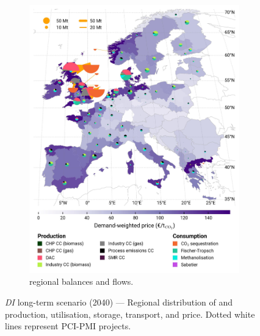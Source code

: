 \documentclass[final,5p,times,twocolumn,sort&compress]{elsarticle}
\begin{document}
\begin{figure}[htbp]
\begin{subfigure}[t]{0.49\textwidth}
      \includegraphics[width=1\textwidth]{maps/no-pipelines-no-pcipmi/base_s_adm___2040-balance_map_co2_stored} 
      \vspace{-0.7cm}
      \caption{ regional balances and flows.}
      \label{fig:DI_lt_2040_co2}
  \end{subfigure}
  \caption{\textit{DI} long-term scenario (2040) --- Regional distribution of  and  production, utilisation, storage, transport, and price. Dotted white lines represent PCI-PMI projects.}
  \label{fig:DI_lt_2040}
\end{figure}
\end{document}

